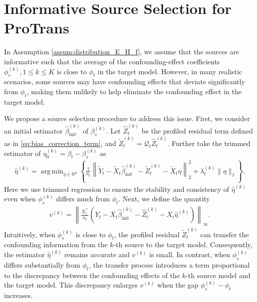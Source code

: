 \documentclass[12pt]{article}
\newtheorem{remark}{Remark}
\DeclareMathOperator*{\argmin}{arg\,min}
\begin{document}



\section{Informative Source Selection for ProTrans}
\label{sec:source_selection}
In Assumption \ref{assum:distribution_E_H_f}, we assume that the sources are informative such that the average of the confounding-effect coefficients $\phi_s^{(k)},1\le k\le K$ is close to $\phi_t$ in the target model. However, in many realistic scenarios, some sources may have confounding effects that deviate significantly from $\phi_t$, making them unlikely to help eliminate the confounding effect in the target model. 

We propose a source selection procedure to address this issue. First, we consider an initial estimator $\hat{\beta}^{(k)}_{\text{init}}$ of $\beta_s^{(k)}$. Let $\hat{Z}_t^{(k)}$ be the profiled residual term defined as in \eqref{eq:bias_correction_term}, and $\tilde{Z}_t^{(k)}=\mathcal{Q}_t\hat{Z}_t^{(k)}$. Further take the trimmed estimator of $\eta^{(k)}_0 = \beta_t - \beta_s^{(k)}$ as
\begin{align*}
\hat{\eta}^{(k)} = \argmin_{\eta\in \mathbb{R}^p}\left\{\frac{1}{n_t}\left\|\tilde{Y}_t - \tilde{X}_t \hat{\beta}^{(k)}_{\text{init}} - \tilde{Z}_t^{(k)} - \tilde{X}_t\eta \right\|_2^2 + \lambda_t^{(k)} \|\eta\|_1\right\}. 
\end{align*}
Here we use trimmed regression to ensure the stability and consistency of $\hat{\eta}^{(k)}$ even when $\phi_s^{(k)}$ differs much from $\phi_t$.
Next, we define the quantity
\begin{align*}
    v^{(k)} = \left\|\frac{X_t^\top}{n_t}\left(Y_t - X_t\hat{\beta}^{(k)}_{\text{init}} - \hat{Z}^{(k)}_{t} - X_t\hat{\eta}^{(k)}\right)\right\|_{\infty}.
\end{align*}
Intuitively, when $\phi_s^{(k)}$ is close to $\phi_t$, the profiled residual $\tilde{Z}_t^{(k)}$ can transfer the confounding information from the $k$-th source to the target model. Consequently, the estimator $\hat{\eta}^{(k)}$ remains accurate and $v^{(k)}$ is small. In contrast, when $\phi_s^{(k)}$ differs substantially from $\phi_t$, the transfer process introduces a term proportional to the discrepancy between the confounding effects of the $k$-th source model and the target model. This discrepancy enlarges $v^{(k)}$ when the gap $\phi_s^{(k)}-\phi_t$ increases.
\end{document}
